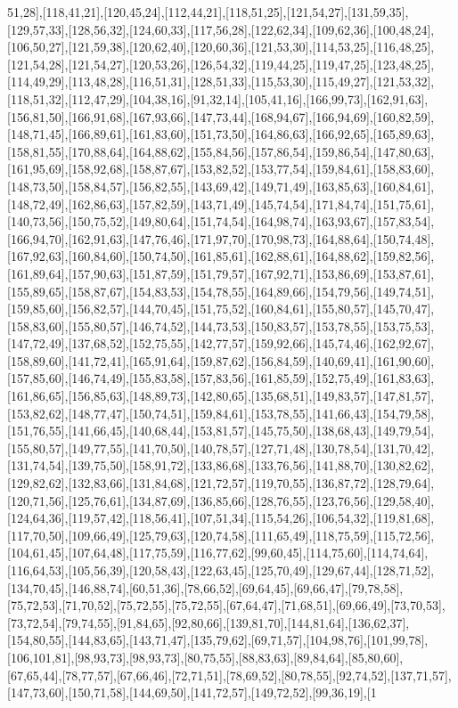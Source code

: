 51,28],[118,41,21],[120,45,24],[112,44,21],[118,51,25],[121,54,27],[131,59,35],[129,57,33],[128,56,32],[124,60,33],[117,56,28],[122,62,34],[109,62,36],[100,48,24],[106,50,27],[121,59,38],[120,62,40],[120,60,36],[121,53,30],[114,53,25],[116,48,25],[121,54,28],[121,54,27],[120,53,26],[126,54,32],[119,44,25],[119,47,25],[123,48,25],[114,49,29],[113,48,28],[116,51,31],[128,51,33],[115,53,30],[115,49,27],[121,53,32],[118,51,32],[112,47,29],[104,38,16],[91,32,14],[105,41,16],[166,99,73],[162,91,63],[156,81,50],[166,91,68],[167,93,66],[147,73,44],[168,94,67],[166,94,69],[160,82,59],[148,71,45],[166,89,61],[161,83,60],[151,73,50],[164,86,63],[166,92,65],[165,89,63],[158,81,55],[170,88,64],[164,88,62],[155,84,56],[157,86,54],[159,86,54],[147,80,63],[161,95,69],[158,92,68],[158,87,67],[153,82,52],[153,77,54],[159,84,61],[158,83,60],[148,73,50],[158,84,57],[156,82,55],[143,69,42],[149,71,49],[163,85,63],[160,84,61],[148,72,49],[162,86,63],[157,82,59],[143,71,49],[145,74,54],[171,84,74],[151,75,61],[140,73,56],[150,75,52],[149,80,64],[151,74,54],[164,98,74],[163,93,67],[157,83,54],[166,94,70],[162,91,63],[147,76,46],[171,97,70],[170,98,73],[164,88,64],[150,74,48],[167,92,63],[160,84,60],[150,74,50],[161,85,61],[162,88,61],[164,88,62],[159,82,56],[161,89,64],[157,90,63],[151,87,59],[151,79,57],[167,92,71],[153,86,69],[153,87,61],[155,89,65],[158,87,67],[154,83,53],[154,78,55],[164,89,66],[154,79,56],[149,74,51],[159,85,60],[156,82,57],[144,70,45],[151,75,52],[160,84,61],[155,80,57],[145,70,47],[158,83,60],[155,80,57],[146,74,52],[144,73,53],[150,83,57],[153,78,55],[153,75,53],[147,72,49],[137,68,52],[152,75,55],[142,77,57],[159,92,66],[145,74,46],[162,92,67],[158,89,60],[141,72,41],[165,91,64],[159,87,62],[156,84,59],[140,69,41],[161,90,60],[157,85,60],[146,74,49],[155,83,58],[157,83,56],[161,85,59],[152,75,49],[161,83,63],[161,86,65],[156,85,63],[148,89,73],[142,80,65],[135,68,51],[149,83,57],[147,81,57],[153,82,62],[148,77,47],[150,74,51],[159,84,61],[153,78,55],[141,66,43],[154,79,58],[151,76,55],[141,66,45],[140,68,44],[153,81,57],[145,75,50],[138,68,43],[149,79,54],[155,80,57],[149,77,55],[141,70,50],[140,78,57],[127,71,48],[130,78,54],[131,70,42],[131,74,54],[139,75,50],[158,91,72],[133,86,68],[133,76,56],[141,88,70],[130,82,62],[129,82,62],[132,83,66],[131,84,68],[121,72,57],[119,70,55],[136,87,72],[128,79,64],[120,71,56],[125,76,61],[134,87,69],[136,85,66],[128,76,55],[123,76,56],[129,58,40],[124,64,36],[119,57,42],[118,56,41],[107,51,34],[115,54,26],[106,54,32],[119,81,68],[117,70,50],[109,66,49],[125,79,63],[120,74,58],[111,65,49],[118,75,59],[115,72,56],[104,61,45],[107,64,48],[117,75,59],[116,77,62],[99,60,45],[114,75,60],[114,74,64],[116,64,53],[105,56,39],[120,58,43],[122,63,45],[125,70,49],[129,67,44],[128,71,52],[134,70,45],[146,88,74],[60,51,36],[78,66,52],[69,64,45],[69,66,47],[79,78,58],[75,72,53],[71,70,52],[75,72,55],[75,72,55],[67,64,47],[71,68,51],[69,66,49],[73,70,53],[73,72,54],[79,74,55],[91,84,65],[92,80,66],[139,81,70],[144,81,64],[136,62,37],[154,80,55],[144,83,65],[143,71,47],[135,79,62],[69,71,57],[104,98,76],[101,99,78],[106,101,81],[98,93,73],[98,93,73],[80,75,55],[88,83,63],[89,84,64],[85,80,60],[67,65,44],[78,77,57],[67,66,46],[72,71,51],[78,69,52],[80,78,55],[92,74,52],[137,71,57],[147,73,60],[150,71,58],[144,69,50],[141,72,57],[149,72,52],[99,36,19],[1